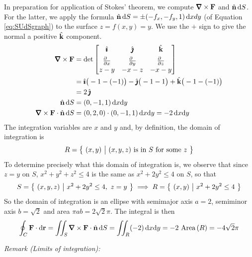 \begin{eg}
In preparation for application of Stokes' theorem, we compute
$\vnabla\times\vF$ and $\hat{\mathbf{n}}\,\mathrm{d}S$. For the latter, we apply the formula
$\hat{\mathbf{n}}\,\mathrm{d}S=\pm(-f_x,-f_y,1)\,\mathrm{d}xdy$ (of Equation \eqref{eq:SUdSgraph})
to the surface $z=f(x,y)=y$. We use the $+$
sign to give the normal a positive $\hat{\mathbf{k}}$ component.
\begin{align*}
\vnabla\times\vF
&=\det\left[\begin{matrix}\hi&\hj&\hk \\[0.05in]
           \frac{\partial\hfill}{\partial x}
                 &\frac{\partial\hfill}{\partial y}
                 &\frac{\partial\hfill}{\partial z}\\
                 z-y&-x-z&-x-y\end{matrix}\right] \\
&=\hi\big(-1-(-1)\big)-\hj\big(-1-1\big)+\hk\big(-1-(-1)\big) \\
&=2\,\hj\\
\hn\,\dee{S}&=(0,-1,1)\,\dee{x}\dee{y}\\
\vnabla\times\vF\cdot\hn\,\dee{S}&=(0,2,0)\cdot(0,-1,1)\,\dee{x}\dee{y}
=-2\,\dee{x}\dee{y}
\end{align*}
The integration variables are $x$ and $y$ and, by definition, 
the domain of integration is
\begin{equation*}
R=\big\{ \ (x,y)\ \big|\ (x,y,z)\text{ is in }S\text{ for some }z\ \big\}
\end{equation*}
To determine precisely what this domain of integration is, we observe that
since $z=y$ on $S$, $x^2+y^2+z^2\le 4$ is the same as $x^2+2y^2\le 4$ on $S$, 
so that  
\begin{equation*}
S=\Set{(x,y,z)}{x^2+2y^2\le 4,\ z=y}
\implies R=\Set{(x,y)}{x^2+2y^2\le 4}
\end{equation*}
So the domain of integration is an ellipse with semimajor axis $a=2$,
semiminor axis $b=\sqrt{2}$ and area $\pi a b=2\sqrt{2}\pi$. The integral is then
\begin{equation*}
\oint_C\vF\cdot \dee{\vr}
=\dblInt_S \vnabla\times\vF\cdot\hn\,\dee{S}
=\dblInt_R (-2)\,\dee{x}\dee{y}
=-2\ \text{Area}\,(R)
=-4\sqrt{2}\pi
\end{equation*}

\medskip
\noindent
\emph{Remark (Limits of integration):}


\end{eg}
